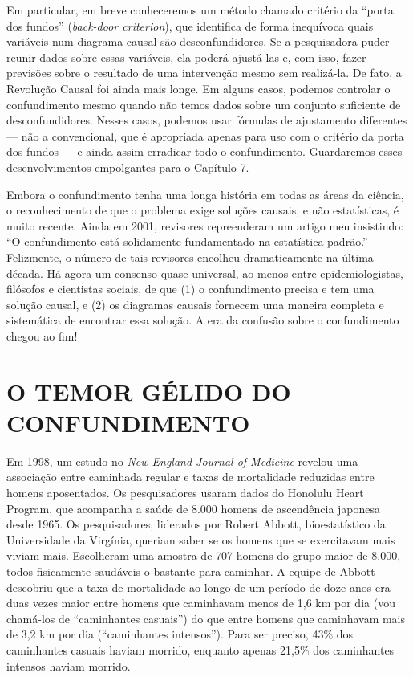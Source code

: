 \documentclass[11pt,a5paper,twoside]{book}
\begin{document}
Em particular, em breve conheceremos um método chamado critério da “porta dos fundos” (\textit{back-door criterion}), que identifica de forma inequívoca quais variáveis num diagrama causal são desconfundidores. Se a pesquisadora puder reunir dados sobre essas variáveis, ela poderá ajustá-las e, com isso, fazer previsões sobre o resultado de uma intervenção mesmo sem realizá-la. De fato, a Revolução Causal foi ainda mais longe. Em alguns casos, podemos controlar o confundimento mesmo quando não temos dados sobre um conjunto suficiente de desconfundidores. Nesses casos, podemos usar fórmulas de ajustamento diferentes — não a convencional, que é apropriada apenas para uso com o critério da porta dos fundos — e ainda assim erradicar todo o confundimento. Guardaremos esses desenvolvimentos empolgantes para o Capítulo 7.

Embora o confundimento tenha uma longa história em todas as áreas da ciência, o reconhecimento de que o problema exige soluções causais, e não estatísticas, é muito recente. Ainda em 2001, revisores repreenderam um artigo meu insistindo: “O confundimento está solidamente fundamentado na estatística padrão.” Felizmente, o número de tais revisores encolheu dramaticamente na última década. Há agora um consenso quase universal, ao menos entre epidemiologistas, filósofos e cientistas sociais, de que (1) o confundimento precisa e tem uma solução causal, e (2) os diagramas causais fornecem uma maneira completa e sistemática de encontrar essa solução. A era da confusão sobre o confundimento chegou ao fim!

\section{O TEMOR GÉLIDO DO CONFUNDIMENTO}
Em 1998, um estudo no \textit{New England Journal of Medicine} revelou uma associação entre caminhada regular e taxas de mortalidade reduzidas entre homens aposentados. Os pesquisadores usaram dados do Honolulu Heart Program, que acompanha a saúde de 8.000 homens de ascendência japonesa desde 1965. Os pesquisadores, liderados por Robert Abbott, bioestatístico da Universidade da Virgínia, queriam saber se os homens que se exercitavam mais viviam mais. Escolheram uma amostra de 707 homens do grupo maior de 8.000, todos fisicamente saudáveis o bastante para caminhar. A equipe de Abbott descobriu que a taxa de mortalidade ao longo de um período de doze anos era duas vezes maior entre homens que caminhavam menos de 1,6 km por dia (vou chamá-los de “caminhantes casuais”) do que entre homens que caminhavam mais de 3,2 km por dia (“caminhantes intensos”). Para ser preciso, 43\% dos caminhantes casuais haviam morrido, enquanto apenas 21,5\% dos caminhantes intensos haviam morrido.
\end{document}
